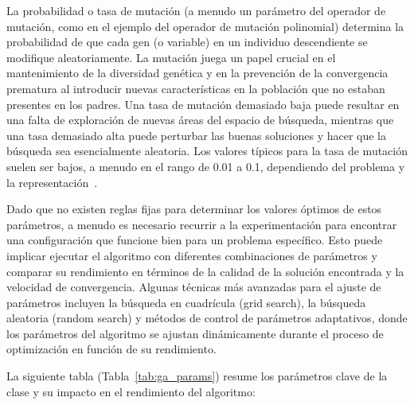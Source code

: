 La probabilidad o tasa de mutación (a menudo un parámetro del operador de mutación, como \texttt{} en el ejemplo del operador de mutación polinomial) determina la probabilidad de que cada gen (o variable) en un individuo descendiente se modifique aleatoriamente. La mutación juega un papel crucial en el mantenimiento de la diversidad genética y en la prevención de la convergencia prematura al introducir nuevas características en la población que no estaban presentes en los padres. Una tasa de mutación demasiado baja puede resultar en una falta de exploración de nuevas áreas del espacio de búsqueda, mientras que una tasa demasiado alta puede perturbar las buenas soluciones y hacer que la búsqueda sea esencialmente aleatoria. Los valores típicos para la tasa de mutación suelen ser bajos, a menudo en el rango de 0.01 a 0.1, dependiendo del problema y la representación~\cite{eiben2015}.

Dado que no existen reglas fijas para determinar los valores óptimos de estos parámetros, a menudo es necesario recurrir a la experimentación para encontrar una configuración que funcione bien para un problema específico. Esto puede implicar ejecutar el algoritmo con diferentes combinaciones de parámetros y comparar su rendimiento en términos de la calidad de la solución encontrada y la velocidad de convergencia. Algunas técnicas más avanzadas para el ajuste de parámetros incluyen la búsqueda en cuadrícula (grid search), la búsqueda aleatoria (random search) y métodos de control de parámetros adaptativos, donde los parámetros del algoritmo se ajustan dinámicamente durante el proceso de optimización en función de su rendimiento.

La siguiente tabla (Tabla~\ref{tab:ga_params}) resume los parámetros clave de la clase \texttt{} y su impacto en el rendimiento del algoritmo:

